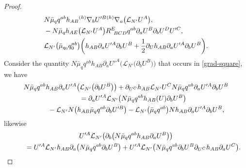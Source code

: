 \documentclass[pdftex]{sigma}
\def\ptl{\partial}%
\def\grad{{\nabla}}%
\newcommand{\leftexp}[2]{{\vphantom{#2}}^{#1}{#2}}
\def\halb{\frac{1}{2}}%
\numberwithin{equation}{section}
\begin{document}
\begin{proof}
\begin{align}
&N \bar{\mu}_q q^{ab} h_{AB} \leftexp{(h)}{\grad}_b U'^B \leftexp{(h)}{\grad}_a \bigl(\mathcal{L}_{N'} U^A\bigr),\nonumber\\
&- N \bar{\mu}_q h_{AE} \bigl(\mathcal{L}_{N'} U^A\bigr) R^E_{\,\,\,BCD} q^{ab} \ptl_a U^B \ptl_b U^D U'^C, \nonumber\\
& \mathcal{L}_{N'} \bigl(\bar{\mu}_{q_0} q^{ab}_0\bigr) \biggl(h_{AB} \ptl_a U'^A \ptl_b U^B + \halb \ptl_{U}h_{AB} \ptl_a U'^A \ptl_b U^B\biggr).\label{grad-square}
\end{align}
Consider the quantity $N \bar{\mu}_q q^{ab} h_{AB} \ptl_a U'^A \bigl(\mathcal{L}_{N'}\bigl(\ptl_b U^B\bigr)\bigr)$ that occurs in \eqref{grad-square}, we have
\begin{gather*}
N \bar{\mu}_q q^{ab} h_{AB} \ptl_a U'^A \bigl(\mathcal{L}_{N'}\bigl(\ptl_b U^B\bigr)\bigr) + \ptl_{U^C} h_{AB} \mathcal{L}_{N'} U^C N \bar{\mu}_qq^{ab}\ptl_a U'^A \ptl_b U^B \notag\\
\qquad{}= \ptl_a U'^A \mathcal{L}_{N'} \bigl(N \bar{\mu}_q q^{ab} h_{AB}(U) \ptl_b U^B\bigr) \notag\\
\quad\qquad{} -\mathcal{L}_{N'} N \bigl(h_{AB} \bar{\mu}_q q^{ab} \ptl_b U'^B\bigr) - \mathcal{L}_{N'} \bigl(\bar{\mu}_q q^{ab}\bigr) N h_{AB} \ptl_a U'^A\ptl_b U^B,
\end{gather*}
likewise
\begin{gather*}
 U'^A \mathcal{L}_{N'} \bigl(\ptl_b \bigl(N \bar{\mu}_q q^{ab} h_{AB} \ptl_a U^B\bigr) \bigr) \notag\\
\qquad{}= U'^A \mathcal{L}_{N'} h_{AB}\ptl_a \bigl(N \bar{\mu}_q q^{ab} \ptl_b U^B\bigr) + U'^A \mathcal{L}_{N'} \bigl(N \bar{\mu}_q q^{ab} \ptl_b U^B \ptl_{U^C} h_{AB} \ptl_a U^C\bigr).
\end{gather*}


\end{proof}
\end{document}
